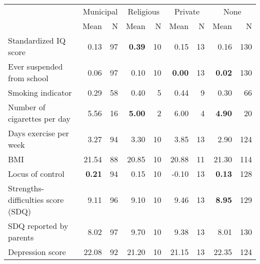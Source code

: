 \begin{tabular}{l r r r r r r r r}
\toprule
& \multicolumn{2}{c}{Municipal} & \multicolumn{2}{c}{Religious} & \multicolumn{2}{c}{Private} & \multicolumn{2}{c}{None} \\
& \scriptsize Mean & \scriptsize N & \scriptsize Mean & \scriptsize N & \scriptsize Mean & \scriptsize N & \scriptsize Mean & \scriptsize N \\
\midrule
Standardized IQ score &      0.13 &        97 & \textbf{     0.39} &        10 &      0.15 &        13 &      0.16 &       130 \\
Ever suspended from school &      0.06 &        97 &      0.10 &        10 & \textbf{     0.00} &        13 & \textbf{     0.02} &       130 \\
Smoking indicator &      0.29 &        58 &      0.40 &         5 &      0.44 &         9 &      0.30 &        66 \\
Number of cigarettes per day &      5.56 &        16 & \textbf{     5.00} &         2 &      6.00 &         4 & \textbf{     4.90} &        20 \\
Days exercise per week &      3.27 &        94 &      3.30 &        10 &      3.85 &        13 &      2.90 &       124 \\
BMI &     21.54 &        88 &     20.85 &        10 &     20.88 &        11 &     21.30 &       114 \\
Locus of control & \textbf{     0.21} &        94 &      0.15 &        10 &     -0.10 &        13 & \textbf{     0.13} &       128 \\
Strengths-difficulties score (SDQ) &      9.11 &        96 &      9.10 &        10 &      9.46 &        13 & \textbf{     8.95} &       129 \\
SDQ reported by parents &      8.02 &        97 &      9.70 &        10 &      9.38 &        13 &      8.01 &       130 \\
Depression score &     22.08 &        92 &     21.20 &        10 &     21.15 &        13 &     22.35 &       124 \\
\bottomrule
\end{tabular}
